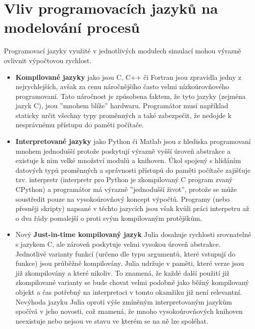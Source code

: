 \section{Vliv programovacích jazyků na modelování procesů}
\label{sec:proglang}
Programovací jazyky využité v jednotlivých modulech simulací mohou výrazně
ovlivnit výpočtovou rychlost.
\begin{itemize}
  \item
    \textbf{Kompilované jazyky} jako jsou C, C++ či Fortran jsou zpravidla
    jedny z nejrychlejších, avšak za cenu náročnějšího často velmi
    nízkoúrovňového programovaní. Tato náročnost je způsobena faktem, že tyto
    jazyky (zejména jazyk C), jsou ''mnohem blíže'' hardwaru. Programátor musí
    například staticky určit všechny typy proměnných a také zabezpečit, že
    nedojde k nesprávnému přístupu do paměti počítače.
  \item
    \textbf{Interpretované jazyky} jako Python či Matlab jsou z hlediska
    programovaní mnohem jednodušší protože poskytují výrazně vyšší úroveň
    abstrakce a existuje k nim velké množství modulů a knihoven. Úkol spojený s
    hlídáním datových typů proměnných a správnosti přístupů do paměti počítače
    zajišťuje tzv. interpretr (interpretr pro Python je zkompilovaný C program
    zvaný CPython) a programátor má výrazně ''jednodušší život'', protože se
    může soustředit pouze na vysokoúrovňový koncept výpočtů. Programy (nebo
    přesněji skripty) napsané v těchto jazycích jsou však kvůli práci
    interpetru až o dva řády pomalejší o proti svým kompilovaným protějškům.
  \item
    Nový \textbf{Just-in-time kompilovaný jazyk} Julia \cite{julia2017}
    dosahuje rychlosti srovnatelné s jazykem C, ale zároveň poskytuje velmi
    vysokou úroveň abstrakce. Jednotlivé varianty funkcí (určeno dle typu
    argumentů, které vstupují do funkce) jsou průběžně kompilovány. Julia
    udržuje v paměti, které verze jsou již zkompilovány a které nikoliv.
    To znamená, že každé další použití již zkompilované varianty se bude chovat
    velmi podobně jako běžný kompilovaný objekt a čas potřebný na interpretaci
    v tomto okamžiku již není relevantní. Nevýhoda jazyku Julia oproti výše
    zmíněným interpretovaným jazykům spočívá v jeho novosti, což znamená, že
    mnoho vysokoúrovňových knihoven neexistuje nebo nejsou ve stavu ve kterém
    se na ně lze spoléhat.
\end{itemize}
